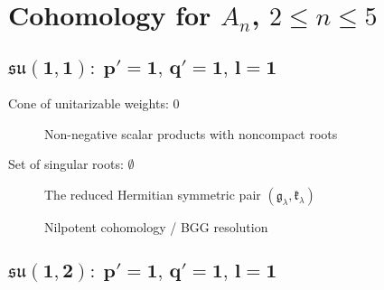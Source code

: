 \section[Cohomology of unitarizable modules for An, 1 < n < 6]{Cohomology for $A_n$, $2 \leq n \leq 5$}

\subsection[su(1,1): 1,1,1]{$\boldsymbol{\mathfrak{su}(1, 1)\!:\; p'= 1,\, q' = 1,\, l = 1}$}

Cone of unitarizable weights: $0$ \\


\begin{figure}[H]
  \centering
  \caption{Non-negative scalar products with noncompact roots}
\end{figure}

\noindent Set of singular roots: $\emptyset$ \\

\begin{figure}[H]
  \centering
  \caption{The reduced Hermitian symmetric pair $(\mathfrak{g}_\lambda, \mathfrak{k}_\lambda)$}
\end{figure}

\begin{figure}[H]
  \centering
  \caption{Nilpotent cohomology / BGG resolution}
\end{figure}

        


\subsection[su(1,2): 1,1,1]{$\boldsymbol{\mathfrak{su}(1, 2)\!:\; p'= 1,\, q' = 1,\, l = 1}$}

